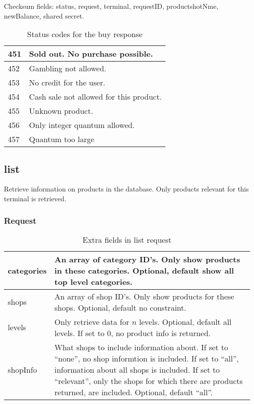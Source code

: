 \documentclass[a4paper,11pt]{article}
\newcommand{\code}[1]
   {\textsf{#1}}
\begin{document}
Checksum fields: status, request, terminal, requestID, productshotNme,
newBalance, shared secret.

\begin{table}[!h]
  \begin{tabular}{|l|l|}
    \hline
      451  & Sold out. No purchase possible.\\\hline
      452  & Gambling not allowed.\\\hline
      453  & No credit for the user.\\\hline
      454  & Cash sale not allowed for this product.\\\hline
      455  & Unknown product. \\\hline
      456  & Only integer quantum allowed. \\\hline
      457  & Quantum too large
  \end{tabular} 
  \caption{Status codes for the \code{buy} response}
\end{table}


\subsection{list}

Retrieve information on products in the database. Only products
relevant for this terminal is retrieved.

\subsubsection{Request}
\begin{table}[!h]
  \begin{tabular}{|l|l|}
    \hline
     categories & An array of category ID's. Only show products in
                  these categories. Optional, default show all top level
                  categories.\\\hline 
     shops      & An array of shop ID's. Only show products for these
                  shops. Optional, default no constraint.  \\\hline
     levels     & Only retrieve data for $n$ levels. Optional, default all
                  levels. If set to 0, no product info is returned.\\\hline 
     shopInfo   & What shops to include information about. If set to
                  ``none'', no shop informtion is included. If set to
                  ``all'', information about all shops is included. If
                  set to ``relevant'', only the shops for which there
                  are products returned, are included. Optional,
                  default ``all''.  
  \end{tabular} 
  \caption{Extra fields in \code{list} request}
\end{table}
\end{document}
